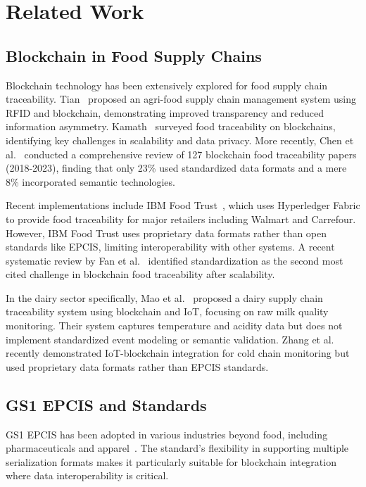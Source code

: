 \documentclass[preprint,review,12pt,authoryear]{elsarticle}
\begin{document}
\section{Related Work}\label{sec:related}

\subsection{Blockchain in Food Supply Chains}

Blockchain technology has been extensively explored for food supply chain traceability. Tian~\cite{tian2016supply} proposed an agri-food supply chain management system using RFID and blockchain, demonstrating improved transparency and reduced information asymmetry. Kamath~\cite{kamath2018food} surveyed food traceability on blockchains, identifying key challenges in scalability and data privacy. More recently, Chen et al.~\cite{chen2023blockchain} conducted a comprehensive review of 127 blockchain food traceability papers (2018-2023), finding that only 23\% used standardized data formats and a mere 8\% incorporated semantic technologies.

Recent implementations include IBM Food Trust~\cite{ibmdocs}, which uses Hyperledger Fabric to provide food traceability for major retailers including Walmart and Carrefour. However, IBM Food Trust uses proprietary data formats rather than open standards like EPCIS, limiting interoperability with other systems. A recent systematic review by Fan et al.~\cite{fan2023systematic} identified standardization as the second most cited challenge in blockchain food traceability after scalability.

In the dairy sector specifically, Mao et al.~\cite{mao2020novel} proposed a dairy supply chain traceability system using blockchain and IoT, focusing on raw milk quality monitoring. Their system captures temperature and acidity data but does not implement standardized event modeling or semantic validation. Zhang et al.~\cite{zhang2024iot} recently demonstrated IoT-blockchain integration for cold chain monitoring but used proprietary data formats rather than EPCIS standards.

\subsection{GS1 EPCIS and Standards}

GS1 EPCIS has been adopted in various industries beyond food, including pharmaceuticals and apparel~\cite{gs1epcis2021}. The standard's flexibility in supporting multiple serialization formats makes it particularly suitable for blockchain integration where data interoperability is critical.
\end{document}
